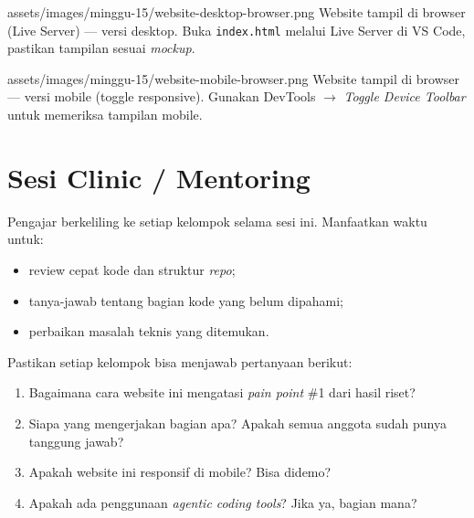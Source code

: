 \begin{tangkapanlayar}
  {assets/images/minggu-15/website-desktop-browser.png}
  {Website tampil di browser (Live Server) --- versi desktop.}
  {Buka \texttt{index.html} melalui Live Server di VS Code, pastikan tampilan sesuai \emph{mockup}.}
\end{tangkapanlayar}

\begin{tangkapanlayar}
  {assets/images/minggu-15/website-mobile-browser.png}
  {Website tampil di browser --- versi mobile (toggle responsive).}
  {Gunakan DevTools $\rightarrow$ \emph{Toggle Device Toolbar} untuk memeriksa tampilan mobile.}
\end{tangkapanlayar}

\section{Sesi Clinic / Mentoring}
\label{sec:clinic}

Pengajar berkeliling ke setiap kelompok selama sesi ini. Manfaatkan waktu untuk:
\begin{itemize}
  \item review cepat kode dan struktur \emph{repo};
  \item tanya-jawab tentang bagian kode yang belum dipahami;
  \item perbaikan masalah teknis yang ditemukan.
\end{itemize}

\begin{catatan}
Pastikan setiap kelompok bisa menjawab pertanyaan berikut:
\begin{enumerate}
  \item Bagaimana cara website ini mengatasi \emph{pain point} \#1 dari hasil riset?
  \item Siapa yang mengerjakan bagian apa? Apakah semua anggota sudah punya tanggung jawab?
  \item Apakah website ini responsif di mobile? Bisa didemo?
  \item Apakah ada penggunaan \emph{agentic coding tools}? Jika ya, bagian mana?
\end{enumerate}
\end{catatan}

